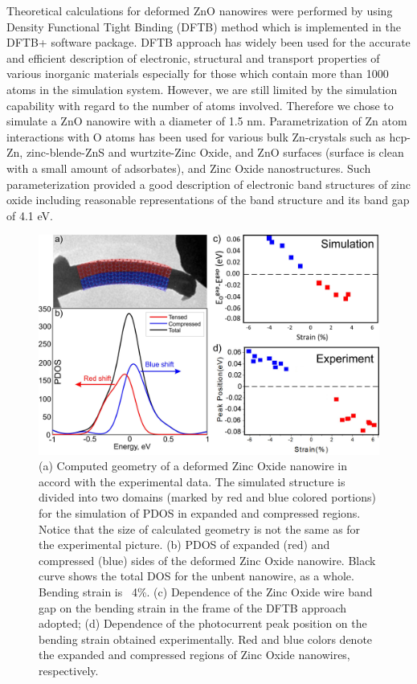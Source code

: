 Theoretical calculations for deformed ZnO nanowires were performed by using Density Functional Tight Binding (DFTB) method which is implemented in the DFTB+ software package.\cite{T.2007} 
DFTB approach has widely been used for the accurate and efficient description of electronic, structural and transport properties of various inorganic materials especially for those which contain more than 1000 atoms in the simulation system. 
However, we are still limited by the simulation capability with regard to the number of atoms involved. 
Therefore we chose to simulate a ZnO nanowire with a diameter of 1.5 nm. 
Parametrization of Zn atom interactions with O atoms has been used for various bulk Zn-crystals such as hcp-Zn, zinc-blende-ZnS and wurtzite-Zinc Oxide, and ZnO surfaces (surface is clean with a small amount of adsorbates), and Zinc Oxide nanostructures. 
Such parameterization provided a good description of electronic band structures of zinc oxide including reasonable representations of the band structure and its band gap of 4.1 eV.\cite{Moreira2009}

\begin{figure}  [ht]
\includegraphics[width=\textwidth]{figures/figure5_3}
\caption[DFTB calculations match experimental results]{(a) Computed geometry of a deformed Zinc Oxide nanowire in accord with the experimental data. The simulated structure is divided into two domains (marked by red and blue colored portions) for the simulation of PDOS in expanded and compressed regions. Notice that the size of calculated geometry is not the same as for the experimental picture. (b) PDOS of expanded (red) and compressed (blue) sides of the deformed Zinc Oxide nanowire. Black curve shows the total DOS for the unbent nanowire, as a whole. Bending strain is ~4\%. (c) Dependence of the Zinc Oxide wire band gap on the bending strain in the frame of the DFTB approach adopted; (d) Dependence of the photocurrent peak position on the bending strain obtained experimentally. Red and blue colors denote the expanded and compressed regions of Zinc Oxide nanowires, respectively. 
\label{fig:5_3}}
\end{figure}


